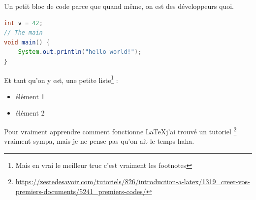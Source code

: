 \documentclass[french]{article}
\begin{document}
\newpage
Un petit bloc de code parce que quand même, on est des développeurs quoi.
\begin{lstlisting}[language=java]
int v = 42;
// The main
void main() {
	System.out.println("hello world!");
}
\end{lstlisting}

Et tant qu'on y est, une petite liste\footnote{Mais en vrai le meilleur truc c'est vraiment les footnotes} :
\begin{itemize}
	\item élément 1
	\item élément 2
\end{itemize}

Pour vraiment apprendre comment fonctionne \LaTeX j'ai trouvé un tutoriel
\footnote{\raggedright\url{https://zestedesavoir.com/tutoriels/826/introduction-a-latex/1319_creer-vos-premiers-documents/5241_premiers-codes/}}
vraiment sympa, mais je ne pense pas qu'on ait le temps haha.
\end{document}
